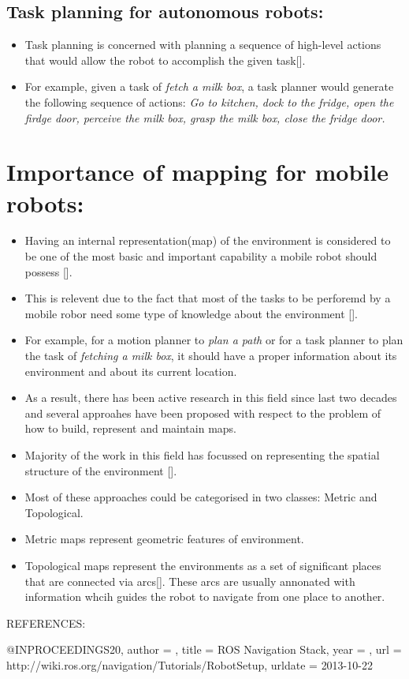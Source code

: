 \subsection{Task planning for autonomous robots:}
\begin{itemize}
 \item Task planning is concerned with planning a sequence of high-level actions that would allow the robot to accomplish the given task[].
 \item For example, given a task of \textit{fetch a milk box}, a task planner would generate the following sequence of actions:
 \textit{Go to kitchen, dock to the fridge, open the firdge door, perceive the milk box, grasp the milk box, close the fridge door.}
\end{itemize}


\section{Importance of mapping for mobile robots:}
\begin{itemize}
 \item Having an internal representation(map) of the environment is considered to be one of the most basic and important capability a mobile robot should possess [].
 \item This is relevent due to the fact that most of the tasks to be perforemd by a mobile robor need some type of knowledge about the environment [].
 \item For example, for a motion planner to \textit{plan a path} or for a task planner to plan  the task of \textit{fetching a milk box}, it should have a proper information about its environment and about its current location.
 \item As a result, there has been active research in this field since last two decades and several approahes have been proposed with respect to the problem of how to build, represent and maintain maps.
 \item Majority of the work in this field has focussed on representing the spatial structure of the environment [].
 \item Most of these approaches could be categorised in two classes: Metric and Topological.
 \item Metric maps represent geometric features of environment.\
 \item Topological maps represent the environments as a set of significant places that are connected via arcs[]. These arcs are usually annonated with information whcih guides the robot to navigate from one place to another. 
\end{itemize}
  
  
  
  
REFERENCES:

@INPROCEEDINGS{20,
  author = {},
  title = {ROS Navigation Stack},
  year = {},
  url = {http://wiki.ros.org/navigation/Tutorials/RobotSetup},
  urldate = {2013-10-22}
}
